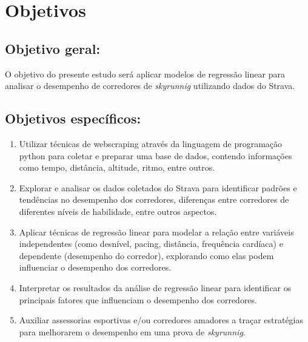 \section{Objetivos}

\subsection{Objetivo geral:}

O objetivo do presente estudo será aplicar modelos de regressão linear para analisar o desempenho de corredores de \textit{skyrunnig} utilizando dados do Strava.

\subsection{Objetivos específicos:}

\begin{enumerate}[1.]

\item Utilizar técnicas de webscraping através da linguagem de programação python para coletar e preparar uma base de dados, contendo informações como tempo, distância, altitude, ritmo, entre outros.

\item Explorar e analisar os dados coletados do Strava para identificar padrões e tendências no desempenho dos corredores, diferenças entre corredores de diferentes níveis de habilidade, entre outros aspectos.

\item Aplicar técnicas de regressão linear para modelar a relação entre variáveis independentes (como desnível, pacing, distância, frequência cardíaca) e dependente (desempenho do corredor), explorando como elas podem influenciar o desempenho dos corredores.

\item Interpretar os resultados da análise de regressão linear para identificar os principais fatores que influenciam o desempenho dos corredores.

\item Auxiliar assessorias esportivas e/ou corredores amadores a traçar estratégias para melhorarem o desempenho em uma prova de \textit{skyrunnig}.
\end{enumerate}